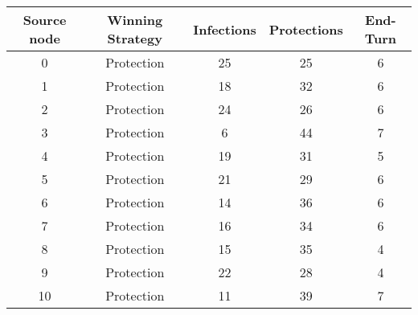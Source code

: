 \documentclass[results.tex]{subfiles}
\begin{document}
    \begin{center}
        \begin{tabular}{| c || c | c | c | c |}
            \hline
            {\bfseries Source node} & {\bfseries Winning Strategy} & {\bfseries Infections} & {\bfseries Protections}
            & {\bfseries End-Turn}
            \\  %
            \hline\hline
            0                       & Protection                   & 25                     & 25                      & 6                    \\
            \hline
            1                       & Protection                   & 18                     & 32                      & 6                    \\
            \hline
            2                       & Protection                   & 24                     & 26                      & 6                    \\
            \hline
            3                       & Protection                   & 6                      & 44                      & 7                    \\
            \hline
            4                       & Protection                   & 19                     & 31                      & 5                    \\
            \hline
            5                       & Protection                   & 21                     & 29                      & 6                    \\
            \hline
            6                       & Protection                   & 14                     & 36                      & 6                    \\
            \hline
            7                       & Protection                   & 16                     & 34                      & 6                    \\
            \hline
            8                       & Protection                   & 15                     & 35                      & 4                    \\
            \hline
            9                       & Protection                   & 22                     & 28                      & 4                    \\
            \hline
            10                      & Protection                   & 11                     & 39                      & 7                    \\

\end{tabular}
\end{center}
\end{document}
